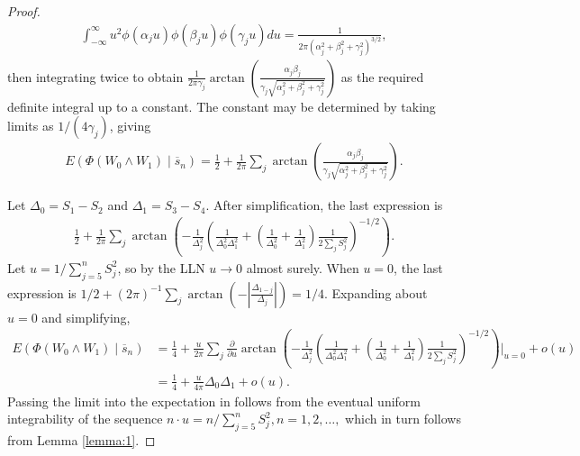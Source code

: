 \documentclass[12pt]{article}
\newcommand{\E}{E}
\newcommand{\s}{S}
\newcommand{\w}{W}
\newcommand{\comment}[1]{
  \iftoggle{commenttoggle}{
    {\normalsize{\color{red}{ #1}}\normalsize}
  }
  {}
}
\begin{document}
\begin{appendices}
\begin{proof}
\begin{align}
      \int_{-\infty}^\infty u^2\phi(\alpha_j u)\phi(\beta_j u)\phi(\gamma_j u)du=\frac{1}{2\pi(\alpha_j^2+\beta_j^2+\gamma_j^2)^{3/2}},
    \end{align}
    then integrating  twice to obtain $\frac{1}{2\pi\gamma_j}\arctan\left(\frac{\alpha_j\beta_j}{\gamma_j\sqrt{\alpha_j^2+\beta_j^2+\gamma_j^2}}\right)$ as the required definite integral up to a constant. The constant may be determined by taking limits as $1/(4\gamma_j)$, giving
    \begin{align}
      \E\left(\Phi(\w_0\wedge \w_1)\mid \overline{s}_n\right) =\frac{1}{2}+\frac{1}{2\pi}\sum_j\arctan\left(\frac{\alpha_j\beta_j}{\gamma_j\sqrt{\alpha_j^2+\beta_j^2+\gamma_j^2}}\right).     
    \end{align}

    Let $\Delta_0=\s_1-\s_2$ and $\Delta_1=\s_3-\s_4$. After simplification, the last expression is
    \begin{align}
      \frac{1}{2}+\frac{1}{2\pi}\sum_j\arctan\left(-\frac{1}{\Delta_j^2}\left(\frac{1}{\Delta_0^2\Delta_1^2}+\left(\frac{1}{\Delta_0^2}+\frac{1}{\Delta_1^2}\right)\frac{1}{2\sum_j\s_j^2}\right)^{-1/2}\right).
    \end{align}
    Let $u=1/\sum_{j=5}^n\s_j^2$, so by the LLN $u\to 0$ almost surely. When $u=0$, the last expression is $1/2 + (2\pi)^{-1}\sum_j \arctan\left(-|\frac{\Delta_{1-j}}{\Delta_j}|\right)=1/4$. Expanding about $u=0$ and simplifying, 
    \begin{align}
      \E\left(\Phi(\w_0\wedge \w_1)\mid \overline{s}_n\right) &=\frac{1}{4} + \frac{u}{2\pi}\sum_j\frac{\partial}{\partial u}\arctan\left(-\frac{1}{\Delta_j^2}\left(\frac{1}{\Delta_0^2\Delta_1^2}+\left(\frac{1}{\Delta_0^2}+\frac{1}{\Delta_1^2}\right)\frac{1}{2\sum_j\s_j^2}\right)^{-1/2}\right)\bigg|_{u=0} + o(u)\\
      &=\frac{1}{4}+\frac{u}{4\pi}\Delta_0\Delta_1 + o(u).
    \end{align}
    Passing the limit into the expectation in  follows from the
    eventual uniform integrability of the sequence
    $n\cdot u=n/\sum_{j=5}^n \s_j^2, n=1,2,\ldots,$ which in turn follows from Lemma    \ref{lemma:1}.
    

\end{proof}
\end{appendices}
\end{document}
